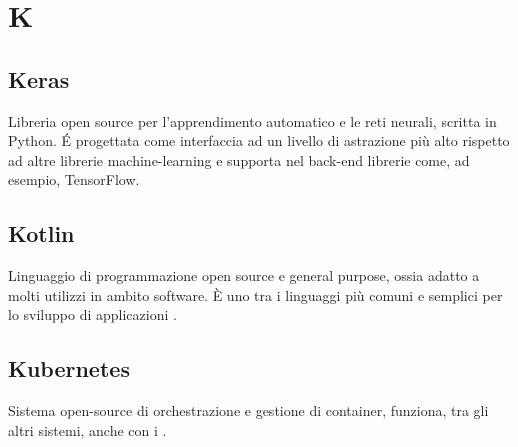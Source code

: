 \section*{K}
\markright{}
\subsection*{Keras}
Libreria open source per l'apprendimento automatico e le reti neurali, scritta in Python. \'E progettata come interfaccia ad un livello di astrazione più alto rispetto ad altre librerie machine-learning e supporta nel back-end librerie come, ad esempio, TensorFlow.
\subsection*{Kotlin}
Linguaggio di programmazione open source e general purpose, ossia adatto a molti utilizzi in ambito software. È uno tra i linguaggi più comuni e semplici per lo sviluppo di applicazioni .  
\subsection*{Kubernetes}
Sistema open-source di orchestrazione e gestione di container, funziona, tra gli altri sistemi, anche con i .